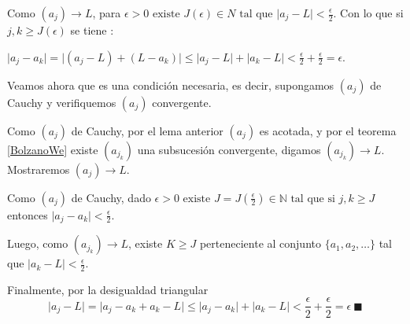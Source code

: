 \documentclass[12pt]{book}
\newcommand\N{{\mathbb N}}
\providecommand{\abs}[1]{\lvert#1\rvert}
\begin{document}
Como $(a_j) \rightarrow L$, para $\epsilon >0 \mbox{ existe } J(\epsilon) \in N \mbox{ tal que } \abs{a_j-L} < \frac{\epsilon}{2}$. Con lo que si $j,k \ge J(\epsilon)$ se tiene :

$\abs{a_j-a_k}=\abs{(a_j-L)+(L-a_k)} \le \abs{a_j-L}+\abs{a_k-L} < \frac{\epsilon}{2}+\frac{\epsilon}{2}=\epsilon$.

Veamos ahora que es una condición necesaria, es decir, supongamos $(a_j)$ de Cauchy y verifiquemos $(a_j)$ convergente.

Como $(a_j)$ de Cauchy, por el lema anterior $(a_j)$ es acotada, y por el teorema \ref{BolzanoWe} existe $(a_{j_k})$ una subsucesión convergente, digamos $(a_{j_k}) \rightarrow L$. Mostraremos $(a_j) \rightarrow L$.

Como $(a_j)$ de Cauchy, dado $\epsilon>0 \mbox{ existe } J=J(\frac{\epsilon}{2}) \in \N \mbox{ tal que si } j,k \ge J$ entonces $\abs{a_j-a_k}<\frac{\epsilon}{2}$.

Luego, como $(a_{j_k}) \rightarrow L$, existe $K \ge J$ perteneciente al conjunto $\{ a_1,a_2,\dots \}$ tal que $\abs{a_k-L}<\frac{\epsilon}{2}$.

Finalmente, por la desigualdad triangular $$\abs{a_j-L}=\abs{a_j-a_k+a_k-L} \le \abs{a_j-a_k}+\abs{a_k-L} <\frac{\epsilon}{2} + \frac{\epsilon}{2} =\epsilon \ \blacksquare$$
\end{document}

